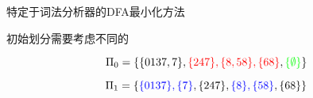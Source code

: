\begin{frame}{}
  \begin{center}
    特定于词法分析器的DFA最小化方法


    \vspace{0.30cm}
    初始划分需要考虑不同的

    \vspace{-0.50cm}
    \[
      \Pi_{0} = \{\{0137, 7\}, \textcolor{red}{\{247\}, \{8, 58\}, \{68\}},
        \textcolor{green}{\{\emptyset\}}\}
    \]

    \pause
    \vspace{-1.00cm}
    \[
      \Pi_{1} = \{\textcolor{blue}{\{0137\}, \{7\}}, \{247\}, \textcolor{blue}{\{8\}, \{58\}},
        \{68\}\}
    \]
  \end{center}
\end{frame}
